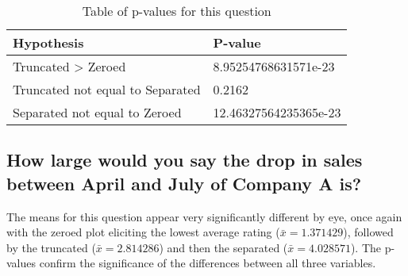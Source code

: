 \documentclass[
]{article}
\newenvironment{Shaded}{\begin{snugshade}}{\end{snugshade}}
\newcommand{\DataTypeTok}[1]{\textcolor[rgb]{0.13,0.29,0.53}{#1}}
\newcommand{\KeywordTok}[1]{\textcolor[rgb]{0.13,0.29,0.53}{\textbf{#1}}}
\newcommand{\NormalTok}[1]{#1}
\newcommand{\OperatorTok}[1]{\textcolor[rgb]{0.81,0.36,0.00}{\textbf{#1}}}
\newcommand{\StringTok}[1]{\textcolor[rgb]{0.31,0.60,0.02}{#1}}
\begin{document}
\begin{Shaded}
\end{Shaded}

\begin{table}[!h]

\caption{\label{tab:unnamed-chunk-54}Table of p-values for this question}
\centering
\begin{tabular}[t]{l|l}
\hline
Hypothesis & P-value\\
\hline
Truncated > Zeroed & 8.95254768631571e-23\\
\hline
Truncated not equal to Separated & 0.2162\\
\hline
Separated not equal to Zeroed & 12.46327564235365e-23\\
\hline
\end{tabular}
\end{table}

\subsection{How large would you say the drop in sales between April and July of Company A  is?}

The means for this question appear very significantly different by eye,
once again with the zeroed plot eliciting the lowest average rating
(\(\bar{x} = 1.371429\)), followed by the truncated
(\(\bar{x} = 2.814286\)) and then the separated
(\(\bar{x} = 4.028571\)). The p-values confirm the significance of the
differences between all three variables.
\end{document}
